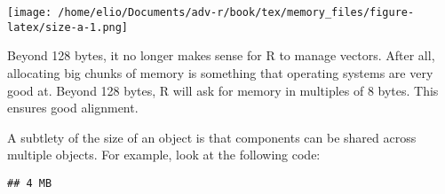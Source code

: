 \begin{Shaded}
\begin{Highlighting}[]
\NormalTok{(}\OperatorTok{:}\OperatorTok{-}\StringTok{ }\NormalTok{, } \NormalTok{, }
   \NormalTok{, } \NormalTok{)}
\NormalTok{(} \NormalTok{, } \NormalTok{)}
\NormalTok{(} \NormalTok{(}\NormalTok{, }\NormalTok{, }\NormalTok{, }\NormalTok{, }\NormalTok{, }\NormalTok{), } \NormalTok{)}
\NormalTok{(} \NormalTok{, } \NormalTok{, } \NormalTok{, } \NormalTok{)}
\OperatorTok{-}\StringTok{ }\NormalTok{, } \NormalTok{)}
\end{Highlighting}
\end{Shaded}

\texttt{[image: /home/elio/Documents/adv-r/book/tex/memory\_files/figure-latex/size-a-1.png]}

Beyond 128 bytes, it no longer makes sense for R to manage vectors.
After all, allocating big chunks of memory is something that operating
systems are very good at. Beyond 128 bytes, R will ask for memory in
multiples of 8 bytes. This ensures good alignment.

A subtlety of the size of an object is that components can be shared
across multiple objects. For example, look at the following code:

\begin{Shaded}
\begin{Highlighting}[]
\StringTok{ }\OperatorTok{:}
\end{Highlighting}
\end{Shaded}

\begin{verbatim}
## 4 MB
\end{verbatim}

\begin{Shaded}
\begin{Highlighting}[]
\StringTok{ }
\end{Highlighting}
\end{Shaded}

